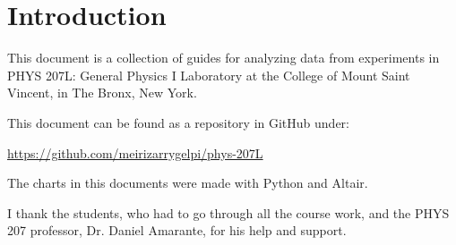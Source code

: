 \chapter*{Introduction}
This document is a collection of guides for analyzing data from experiments in PHYS 207L: General Physics I Laboratory at the College of Mount Saint Vincent, in The Bronx, New York.

This document can be found as a repository in GitHub under:
\begin{center}
    \url{https://github.com/meirizarrygelpi/phys-207L}
\end{center}
The charts in this documents were made with Python and Altair.

I thank the students, who had to go through all the course work, and the PHYS 207 professor, Dr. Daniel Amarante, for his help and support.